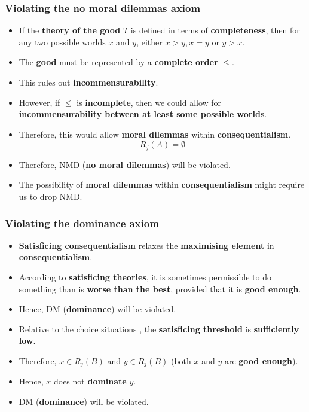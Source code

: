 \documentclass[11pt]{article}
\begin{document}
\subsubsection{Violating the no moral dilemmas axiom}
\label{sec:orgb446f4d}
\begin{itemize}
\item If the \textbf{theory of the good} \(T\) is defined in terms of \textbf{completeness}, then for any two possible worlds \(x\) and \(y\), either \(x > y, x = y\) or \(y > x\).
\item The \textbf{good} must be represented by a \textbf{complete order} \(\le\).
\item This rules out \textbf{incommensurability}.
\item However, if \(\le\) is \textbf{incomplete}, then we could allow for \textbf{incommensurability between at least some possible worlds}.
\item Therefore, this would allow \textbf{moral dilemmas} within \textbf{consequentialism}.
\[R_j (A) = \emptyset\]
\item Therefore, NMD (\textbf{no moral dilemmas}) will be violated.
\item The possibility of \textbf{moral dilemmas} within \textbf{consequentialism} might require us to drop NMD.
\end{itemize}

 \newpage
\subsubsection{Violating the dominance axiom}
\label{sec:orgf51eb62}
\begin{itemize}
\item \textbf{Satisficing consequentialism} relaxes the \textbf{maximising element} in \textbf{consequentialism}.
\item According to \textbf{satisficing theories}, it is sometimes permissible to do something than is \textbf{worse than the best}, provided that it is \textbf{good enough}.
\item Hence, DM (\textbf{dominance}) will be violated.
\item Relative to the choice situations \(<j, B>\), the \textbf{satisficing threshold} is \textbf{sufficiently low}.
\item Therefore, \(x \in R_j (B)\) and \(y \in R_j (B)\) (both \(x\) and \(y\) are \textbf{good enough}).
\item Hence, \(x\) does not \textbf{dominate} \(y\).
\item DM (\textbf{dominance}) will be violated.
\end{itemize}
\end{document}

